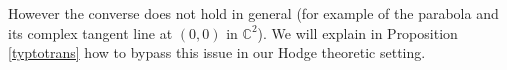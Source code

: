 \documentclass[10pt]{article}
\numberwithin{equation}{subsection}
\theoremstyle{plain}
\newtheorem{proposition}[theorem]{Proposition}
\theoremstyle{definition}
\theoremstyle{remark}
\newcommand{\C}{\mathbb C}
\newcommand{\im}{\mathrm{im} \hspace{0.05cm}}
\begin{document}
However the converse does not hold in general (for example of the parabola and its complex tangent line at $(0,0)$ in $\C^2$). We will explain in Proposition \ref{typtotrans} how to bypass this issue in our Hodge theoretic setting.
%
\end{document}
